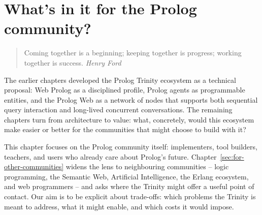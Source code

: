 \chapter{What's in it for the Prolog community?}\label{sec:whats-in-it-for-the-prolog-community}

\vspace{0.5cm}

\begin{quotation}
\noindent Coming together is a beginning; keeping together is progress; working
together is success.
\flushright\textit{Henry Ford}
\vspace{0.5cm}
\end{quotation}

\noindent The earlier chapters developed the Prolog Trinity ecosystem as a technical proposal: Web Prolog as a disciplined profile, Prolog agents as programmable entities, and the Prolog Web as a network of nodes that supports both sequential query interaction and long-lived concurrent conversations. The remaining chapters turn from architecture to value: what, concretely, would this ecosystem make easier or better for the communities that might choose to build with it?

This chapter focuses on the Prolog community itself: implementers, tool builders, teachers, and users who already care about Prolog's future. Chapter~\ref{sec:for-other-communities} widens the lens to neighbouring communities -- logic programming, the Semantic Web, Artificial Intelligence, the Erlang ecosystem, and web programmers -- and asks where the Trinity might offer a useful point of contact. Our aim is to be explicit about trade-offs: which problems the Trinity is meant to address, what it might enable, and which costs it would impose.


